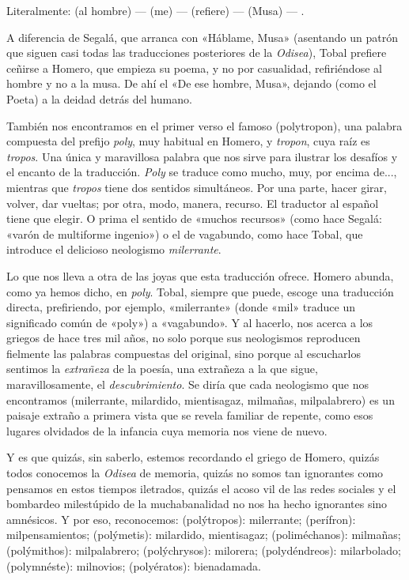 Literalmente:  (al hombre) ---  (me) ---  (refiere) ---  (Musa) --- .

A diferencia de Segalá, que arranca con «Háblame, Musa» (asentando un patrón que siguen casi todas las traducciones posteriores de la \emph{Odisea}), Tobal prefiere ceñirse a Homero, que empieza su poema, y no por casualidad, refiriéndose al hombre y no a la musa. De ahí el «De ese hombre, Musa», dejando (como el Poeta) a la deidad detrás del humano.

También nos encontramos en el primer verso el famoso  (polytropon), una palabra compuesta del prefijo \emph{poly}, muy habitual en Homero, y \emph{tropon}, cuya raíz es \emph{tropos}. Una única y maravillosa palabra que nos sirve para ilustrar los desafíos y el encanto de la traducción. \emph{Poly} se traduce como mucho, muy, por encima de..., mientras que \emph{tropos} tiene dos sentidos simultáneos. Por una parte, hacer girar, volver, dar vueltas; por otra, modo, manera, recurso. El traductor al español tiene que elegir. O prima el sentido de «muchos recursos» (como hace Segalá: «varón de multiforme ingenio») o el de vagabundo, como hace Tobal, que introduce el delicioso neologismo \emph{milerrante}.

Lo que nos lleva a otra de las joyas que esta traducción ofrece. Homero abunda, como ya hemos dicho, en \emph{poly}. Tobal, siempre que puede, escoge una traducción directa, prefiriendo, por ejemplo, «milerrante» (donde «mil» traduce un significado común de «poly») a «vagabundo». Y al hacerlo, nos acerca a los griegos de hace tres mil años, no solo porque sus neologismos reproducen fielmente las palabras compuestas del original, sino porque al escucharlos sentimos la \emph{extrañeza} de la poesía, una extrañeza a la que sigue, maravillosamente, el \emph{descubrimiento}. Se diría que cada neologismo que nos encontramos (milerrante, milardido, mientisagaz, milmañas, milpalabrero) es un paisaje extraño a primera vista que se revela familiar de repente, como esos lugares olvidados de la infancia cuya memoria nos viene de nuevo.

Y es que quizás, sin saberlo, estemos recordando el griego de Homero, quizás todos conocemos la \emph{Odisea} de memoria, quizás no somos tan ignorantes como pensamos en estos tiempos iletrados, quizás el acoso vil de las redes sociales y el bombardeo milestúpido de la muchabanalidad no nos ha hecho ignorantes sino amnésicos. Y por eso, reconocemos:  (polýtropos): milerrante;  (perífron): milpensamientos;  (polýmetis): milardido, mientisagaz;  (poliméchanos): milmañas;  (polýmithos): milpalabrero;  (polýchrysos): milorera;  (polydéndreos): milarbolado;  (polymnéste): milnovios;  (polyératos): bienadamada.

